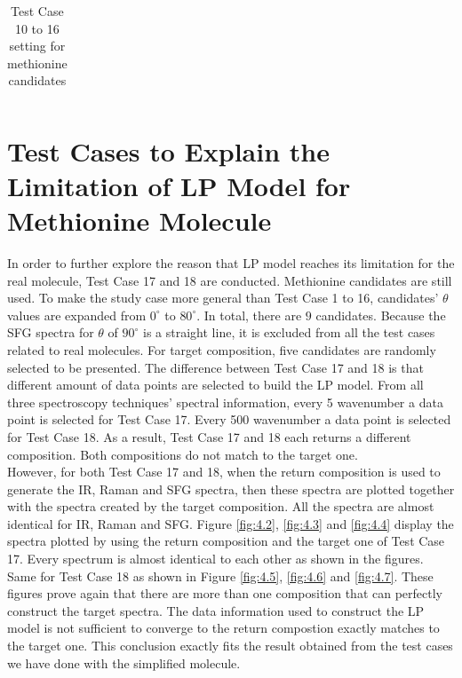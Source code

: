 \begin{table}
\begin{center}
{\begin{tabular}{| l | p{3cm} | l | l |}
\end{tabular} 
}
\end{center}
\caption{Test Case 10 to 16 setting for methionine candidates} \label{tab:4.3}
\end{table}

\section{Test Cases to Explain the Limitation of LP Model for Methionine Molecule}

In order to further explore the reason that LP model reaches its limitation for the real molecule, Test Case 17 and 18 are conducted. Methionine candidates are still used. To make the study case more general than Test Case 1 to 16, candidates' $\theta$ values are expanded from $0^{\circ}$ to $80^{\circ}$. In total, there are $9$ candidates. Because the SFG spectra for $\theta$ of $90^{\circ}$ is a straight line, it is excluded from all the test cases related to real molecules. For target composition, five candidates are randomly selected to be presented. The difference between Test Case 17 and 18 is that different amount of data points are selected to build the LP model. From all three spectroscopy techniques' spectral information, every 5 wavenumber a data point is selected for Test Case 17. Every 500 wavenumber a data point is selected for Test Case 18. As a result, Test Case 17 and 18 each returns a different composition. Both compositions do not match to the target one. \\

However, for both Test Case 17 and 18, when the return composition is used to generate the IR, Raman and SFG spectra, then these spectra are plotted together with the spectra created by the target composition. All the spectra are almost identical for IR, Raman and SFG. Figure \ref{fig:4.2}, \ref{fig:4.3} and \ref{fig:4.4} display the spectra plotted by using the return composition and the target one of Test Case 17. Every spectrum is almost identical to each other as shown in the figures. Same for Test Case 18 as shown in Figure \ref{fig:4.5}, \ref{fig:4.6} and \ref{fig:4.7}. These figures prove again that there are more than one composition that can perfectly construct the target spectra. The data information used to construct the LP model is not sufficient to converge to the return compostion exactly matches to the target one. This conclusion exactly fits the result obtained from the test cases we have done with the simplified molecule.\\

